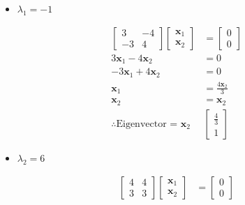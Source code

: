\documentclass[12pt, a4paper]{scrartcl}
\begin{document}
\begin{enumerate}
\begin{enumerate}
                \pagebreak

                \begin{itemize}
                    \item[] $\lambda_1 = -1$
                \end{itemize}
                \begin{align*}
                    \begin{bmatrix}
                        3&-4\\-3&4 
                    \end{bmatrix}\begin{bmatrix}
                        \textbf{x}_1\\\textbf{x}_2
                    \end{bmatrix}&=\begin{bmatrix}
                        0\\0
                    \end{bmatrix}
                    \\ 3\textbf{x}_1-4\textbf{x}_2&=0
                    \\ -3\textbf{x}_1+4\textbf{x}_2&=0
                    \\ \textbf{x}_1 &= \frac{4\textbf{x}_2}{3}
                    \\ \textbf{x}_2 &= \textbf{x}_2
                    \\ \therefore \mbox{Eigenvector = }\textbf{x}_2&\begin{bmatrix}
                        \frac{4}{3}\\1
                    \end{bmatrix}
                \end{align*}
                \begin{itemize}
                    \item[] $\lambda_2 = 6$
                \end{itemize}
                \begin{align*}
                    \begin{bmatrix}
                        4&4\\3&3
                    \end{bmatrix}\begin{bmatrix}
                        \textbf{x}_1\\\textbf{x}_2
                    \end{bmatrix} &= \begin{bmatrix}
                        0\\0

\end{bmatrix}
\end{align*}
\end{enumerate}
\end{enumerate}
\end{document}
